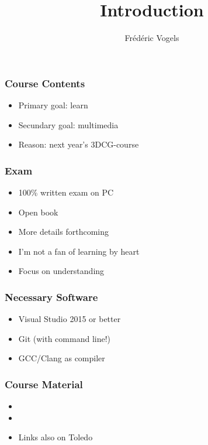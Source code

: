 \documentclass{../ucll-slides}
\title{Introduction}
\author{Fr\'ed\'eric Vogels}
\begin{document}
\begin{frame}
  \titlepage
\end{frame}

\begin{frame}
  \frametitle{Course Contents}
  \Large
  \begin{itemize}
    \item Primary goal: learn \cpp
    \item Secundary goal: multimedia
    \item Reason: next year's 3DCG-course
  \end{itemize}
\end{frame}

\begin{frame}
  \frametitle{Exam}
  \Large
  \begin{itemize}
    \item 100\% written exam on PC
    \item Open book
    \item More details forthcoming
    \item I'm not a fan of learning by heart
    \item Focus on understanding
  \end{itemize}
\end{frame}

\begin{frame}
  \frametitle{Necessary Software}
  \Large
  \begin{itemize}
    \item Visual Studio 2015 or better
    \item Git (with command line!)
  \end{itemize}
  \vskip5mm
  \begin{itemize}
    \item GCC/Clang as compiler
  \end{itemize}
\end{frame}

\begin{frame}
  \frametitle{Course Material} \Large
  \begin{itemize}
    \item {}
    \item {}
    \item Links also on Toledo
  \end{itemize}
\end{frame}
\end{document}
